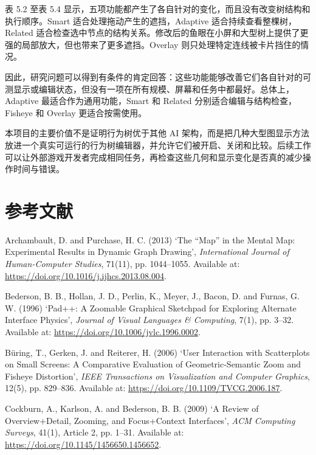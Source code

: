 \documentclass[11pt,a4paper,oneside,extrafontsizes]{memoir}
\begin{document}
表 5.2 至表 5.4 显示，五项功能都产生了各自针对的变化，而且没有改变树结构和执行顺序。Smart 适合处理拖动产生的遮挡，Adaptive 适合持续查看整棵树，Related 适合检查选中节点的结构关系。修改后的鱼眼在小屏和大型树上提供了更强的局部放大，但也带来了更多遮挡。Overlay 则只处理特定连线被卡片挡住的情况。

因此，研究问题可以得到有条件的肯定回答：这些功能能够改善它们各自针对的可测显示或编辑状态，但没有一项在所有规模、屏幕和任务中都最好。总体上，Adaptive 最适合作为通用功能，Smart 和 Related 分别适合编辑与结构检查，Fisheye 和 Overlay 更适合按需使用。

本项目的主要价值不是证明行为树优于其他 AI 架构，而是把几种大型图显示方法放进一个真实可运行的行为树编辑器，并允许它们被开启、关闭和比较。后续工作可以让外部游戏开发者完成相同任务，再检查这些几何和显示变化是否真的减少操作时间与错误。

\chapter*{参考文献}

Archambault, D. and Purchase, H. C. (2013) ‘The “Map” in the Mental Map: Experimental Results in Dynamic Graph Drawing’, \emph{International Journal of Human-Computer Studies}, 71(11), pp. 1044–1055. Available at: \href{https://doi.org/10.1016/j.ijhcs.2013.08.004}{https://doi.org/10.1016/j.ijhcs.2013.08.004}.

Bederson, B. B., Hollan, J. D., Perlin, K., Meyer, J., Bacon, D. and Furnas, G. W. (1996) ‘Pad++: A Zoomable Graphical Sketchpad for Exploring Alternate Interface Physics’, \emph{Journal of Visual Languages \& Computing}, 7(1), pp. 3–32. Available at: \href{https://doi.org/10.1006/jvlc.1996.0002}{https://doi.org/10.1006/jvlc.1996.0002}.

Büring, T., Gerken, J. and Reiterer, H. (2006) ‘User Interaction with Scatterplots on Small Screens: A Comparative Evaluation of Geometric-Semantic Zoom and Fisheye Distortion’, \emph{IEEE Transactions on Visualization and Computer Graphics}, 12(5), pp. 829–836. Available at: \href{https://doi.org/10.1109/TVCG.2006.187}{https://doi.org/10.1109/TVCG.2006.187}.

Cockburn, A., Karlson, A. and Bederson, B. B. (2009) ‘A Review of Overview+Detail, Zooming, and Focus+Context Interfaces’, \emph{ACM Computing Surveys}, 41(1), Article 2, pp. 1–31. Available at: \href{https://doi.org/10.1145/1456650.1456652}{https://doi.org/10.1145/1456650.1456652}.
\end{document}
